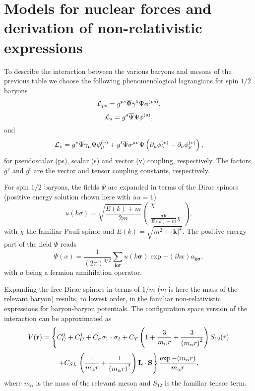 \documentclass[graybox,sectrefs,envcountresetchap,open=right]{svmonodo}
\begin{document}
\section{Models for nuclear forces and derivation of non-relativistic expressions}

To describe the interaction between the various baryons and mesons of the previous
table we choose the following phenomenological
lagrangians
for spin $1/2$ baryons
\[
   {\cal L}_{ps} =g^{ps}\overline{\Psi}\gamma^{5}
   \Psi\phi^{(ps)},
\]
\[
   {\cal L}_{s} =g^{s}\overline{\Psi}\Psi\phi^{(s)},
\]
and
\[
   {\cal L}_{v} =g^{v}\overline{\Psi}\gamma_{\mu}\Psi\phi_{\mu}^{(v)}
   +g^{t}\overline{\Psi}\sigma^{\mu\nu}\Psi\left
   (\partial_{\mu}\phi_{\nu}^{(v)}
   -\partial_{\nu}\phi_{\mu}^{(v)}\right),
\]
for pseudoscalar (ps), scalar (s) and vector (v) coupling, respectively.
The factors $g^{v}$ and $g^{t}$ are the vector
and tensor coupling constants, respectively.

For spin $1/2$ baryons, the fields $\Psi$ are expanded
in terms of the Dirac spinors (positive energy
solution shown here with $\overline{u}u=1$)
\[
   u(k\sigma)=\sqrt{\frac{E(k)+m}{2m}}
	  \left(\begin{array}{c} \chi\\ \\
	  \frac{\mathbf{\sigma}\mathbf{k}}{E(k)+m}\chi
	  \end{array}\right), 
\]
with $\chi$ the familiar Pauli spinor and $E(k) =\sqrt{m^2 +|\mathbf{k}|^2}$. 
The positive energy part of the field $\Psi$ reads
\[
\Psi (x)={\displaystyle \frac{1}{(2\pi )^{3/2}}
        \sum_{\mathbf{k}\mathbf{\sigma}}u(k\mathbf{\sigma})\exp{-(ikx)}a_{\mathbf{k}\mathbf{\sigma}}},
\]
with $a$ being a fermion annihilation operator.

\noindent
Expanding the free Dirac spinors
in terms of $1/m$ ($m$ is here the mass of the relevant baryon) 
results, to lowest order, in the familiar non-relativistic
expressions for baryon-baryon potentials.
The configuration space version of the interaction can be approximated as
\[
V(\mathbf{r})= \left\{ C^0_C + C^1_C + C_\sigma 
\mathbf{\sigma}_1\cdot\mathbf{\sigma}_2
 + C_T \left( 1 + {3\over m_\alpha r} + {3\over
\left(m_\alpha r\right)^2}
\right) S_{12} (\hat r)\right.
\]
\[
+ C_{SL}\left. \left( {1\over m_\alpha r} + {1\over \left( m_\alpha r\right)^2}
\right) \mathbf{L}\cdot \mathbf{S}
\right\} \frac{\exp{-(m_\alpha r)}}{m_\alpha r},
\]
where $m_{\alpha}$ is the mass of the relevant meson and
$S_{12}$ is the familiar tensor term.
\end{document}
